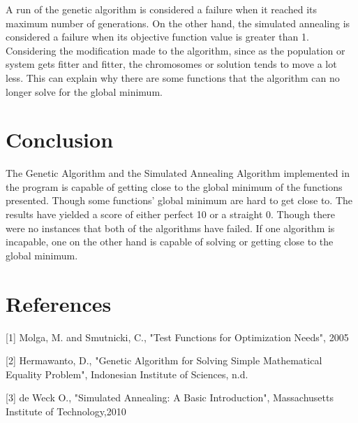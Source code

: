 \documentclass{article}
\begin{document}
A run of the genetic algorithm is considered a failure when it reached its maximum number of generations. On the other hand, the simulated annealing is considered a failure when its objective function value is greater than 1. Considering the modification made to the algorithm, since as the population or system gets fitter and fitter, the chromosomes or solution tends to move a lot less. This can explain why there are some functions that the algorithm can no longer solve for the global minimum.

\section{Conclusion}
The Genetic Algorithm and the Simulated Annealing Algorithm implemented in the program is capable of getting close to the global minimum of the functions presented. Though some functions' global minimum are hard to get close to. The results have yielded a score of either perfect 10 or a straight 0. Though there were no instances that both of the algorithms have failed. If one algorithm is incapable, one on the other hand is capable of solving or getting close to the global minimum.

\section{References}
[1] Molga, M. and Smutnicki, C., "Test Functions for Optimization Needs", 2005

[2] Hermawanto, D., "Genetic Algorithm for Solving Simple Mathematical Equality Problem", Indonesian Institute of Sciences, n.d.

[3] de Weck O.,  "Simulated Annealing: A Basic Introduction", Massachusetts Institute of Technology,2010 
\end{document}

